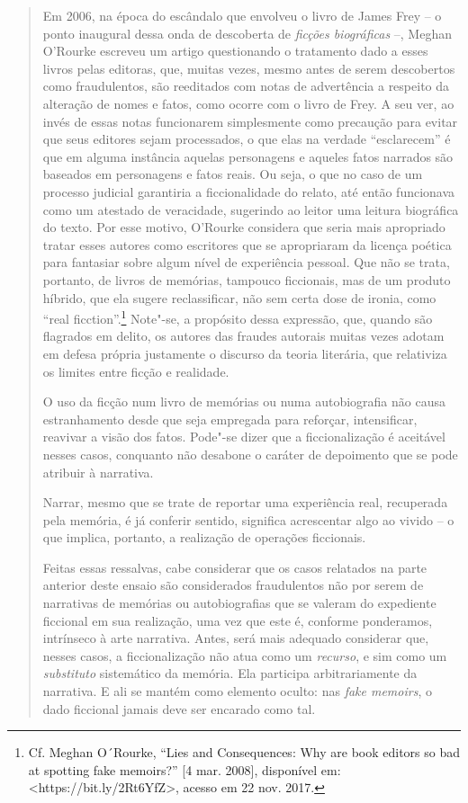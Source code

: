 \begin{quote}
Em 2006, na época do escândalo que envolveu o livro de James Frey -- o
ponto inaugural dessa onda de descoberta de \emph{ficções biográficas}
--, Meghan O'Rourke escreveu um artigo questionando o tratamento dado a
esses livros pelas editoras, que, muitas vezes, mesmo antes de serem
descobertos como fraudulentos, são reeditados com notas de advertência a
respeito da alteração de nomes e fatos, como ocorre com o livro de Frey.
A seu ver, ao invés de essas notas funcionarem simplesmente como
precaução para evitar que seus editores sejam processados, o que elas na
verdade ``esclarecem'' é que em alguma instância aquelas personagens e
aqueles fatos narrados são baseados em personagens e fatos reais. Ou
seja, o que no caso de um processo judicial garantiria a ficcionalidade
do relato, até então funcionava como um atestado de veracidade,
sugerindo ao leitor uma leitura biográfica do texto. Por esse motivo,
O'Rourke considera que seria mais apropriado tratar esses autores como
escritores que se apropriaram da licença poética para fantasiar sobre
algum nível de experiência pessoal. Que não se trata, portanto, de
livros de memórias, tampouco ficcionais, mas de um produto híbrido, que
ela sugere reclassificar, não sem certa dose de ironia, como ``real
ficction''.\footnote{Cf. Meghan O´Rourke, ``Lies and Consequences: Why
  are book editors so bad at spotting fake memoirs?'' {[}4 mar. 2008{]},
  disponível em:
  \textless{}https://bit.ly/2Rt6YfZ\textgreater{},
  acesso em 22 nov. 2017.} Note"-se, a propósito dessa expressão, que,
quando são flagrados em delito, os autores das fraudes autorais muitas
vezes adotam em defesa própria justamente o discurso da teoria
literária, que relativiza os limites entre ficção e realidade.

O uso da ficção num livro de memórias ou numa autobiografia não causa
estranhamento desde que seja empregada para reforçar, intensificar,
reavivar a visão dos fatos. Pode"-se dizer que a ficcionalização é
aceitável nesses casos, conquanto não desabone o caráter de depoimento
que se pode atribuir à narrativa.

Narrar, mesmo que se trate de reportar uma experiência real, recuperada
pela memória, é já conferir sentido, significa acrescentar algo ao
vivido -- o que implica, portanto, a realização de operações ficcionais.

Feitas essas ressalvas, cabe considerar que os casos relatados na parte
anterior deste ensaio são considerados fraudulentos não por serem de
narrativas de memórias ou autobiografias que se valeram do expediente
ficcional em sua realização, uma vez que este é, conforme ponderamos,
intrínseco à arte narrativa. Antes, será mais adequado considerar que,
nesses casos, a ficcionalização não atua como um \emph{recurso}, e sim
como um \emph{substituto} sistemático da memória. Ela participa
arbitrariamente da narrativa. E ali se mantém como elemento oculto: nas
\emph{fake memoirs}, o dado ficcional jamais deve ser encarado como tal.


\end{quote}

